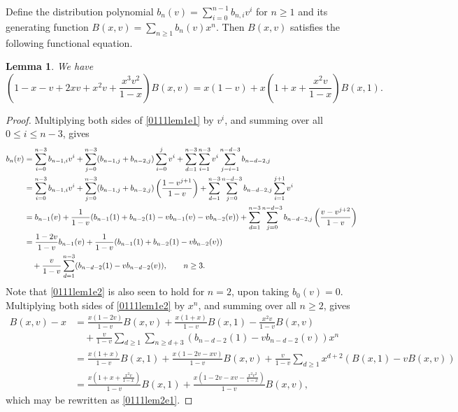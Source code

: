 \documentclass{article}
\theoremstyle{remark}
\theoremstyle{plain}
\newtheorem{lemma}[theorem]{Lemma}
\begin{document}
Define the distribution polynomial $b_n(v)=\sum_{i=0}^{n-1}b_{n,i}v^i$ for $n \geq 1$ and its generating function $B(x,v)=\sum_{n\geq1}b_n(v)x^n$.  Then $B(x,v)$ satisfies the following functional equation.

\begin{lemma}\label{0111lem2}
We have
\begin{equation}\label{0111lem2e1}
\left(1-x-v+2xv+x^2v+\frac{x^3v^2}{1-x}\right)B(x,v)=x(1-v)+x\left(1+x+\frac{x^2v}{1-x}\right)B(x,1).
\end{equation}
\end{lemma}
\begin{proof}
Multiplying both sides of \eqref{0111lem1e1} by $v^i$, and summing over all $0 \leq i \leq n-3$, gives
\begin{align}
b_n(v)&=\sum_{i=0}^{n-3}b_{n-1,i}v^i+\sum_{j=0}^{n-3}(b_{n-1,j}+b_{n-2,j})\sum_{i=0}^jv^i+\sum_{d=1}^{n-3}\sum_{i=1}^{n-3}v^i\sum_{j=i-1}^{n-d-3}b_{n-d-2,j}\notag\\
&=\sum_{i=0}^{n-3}b_{n-1,i}v^i+\sum_{j=0}^{n-3}(b_{n-1,j}+b_{n-2,j})\left(\frac{1-v^{j+1}}{1-v}\right)+\sum_{d=1}^{n-3}\sum_{j=0}^{n-d-3}b_{n-d-2,j}\sum_{i=1}^{j+1}v^i\notag\\
&=b_{n-1}(v)+\frac{1}{1-v}(b_{n-1}(1)+b_{n-2}(1)-vb_{n-1}(v)-vb_{n-2}(v))+\sum_{d=1}^{n-3}\sum_{j=0}^{n-d-3}b_{n-d-2,j}\left(\frac{v-v^{j+2}}{1-v}\right)\notag\\
&=\frac{1-2v}{1-v}b_{n-1}(v)+\frac{1}{1-v}(b_{n-1}(1)+b_{n-2}(1)-vb_{n-2}(v))\notag\\
&\quad+\frac{v}{1-v}\sum_{d=1}^{n-3}(b_{n-d-2}(1)-vb_{n-d-2}(v)), \qquad n \geq 3. \label{0111lem1e2}
\end{align}
Note that \eqref{0111lem1e2} is also seen to hold for $n=2$, upon taking $b_0(v)=0$.  Multiplying both sides of \eqref{0111lem1e2} by $x^n$, and summing over all $n \geq 2$, gives
\begin{align*}
B(x,v)-x&=\frac{x(1-2v)}{1-v}B(x,v)+\frac{x(1+x)}{1-v}B(x,1)-\frac{x^2v}{1-v}B(x,v)\\
&\quad+\frac{v}{1-v}\sum_{d\geq1}\sum_{n\geq d+3}(b_{n-d-2}(1)-vb_{n-d-2}(v))x^n\\
&=\frac{x(1+x)}{1-v}B(x,1)+\frac{x(1-2v-xv)}{1-v}B(x,v)+\frac{v}{1-v}\sum_{d\geq1}x^{d+2}(B(x,1)-vB(x,v))\\
&=\frac{x\left(1+x+\frac{x^2v}{1-x}\right)}{1-v}B(x,1)+\frac{x\left(1-2v-xv-\frac{x^2v^2}{1-x}\right)}{1-v}B(x,v),
\end{align*}
which may be rewritten as \eqref{0111lem2e1}.
\end{proof}
\end{document}
